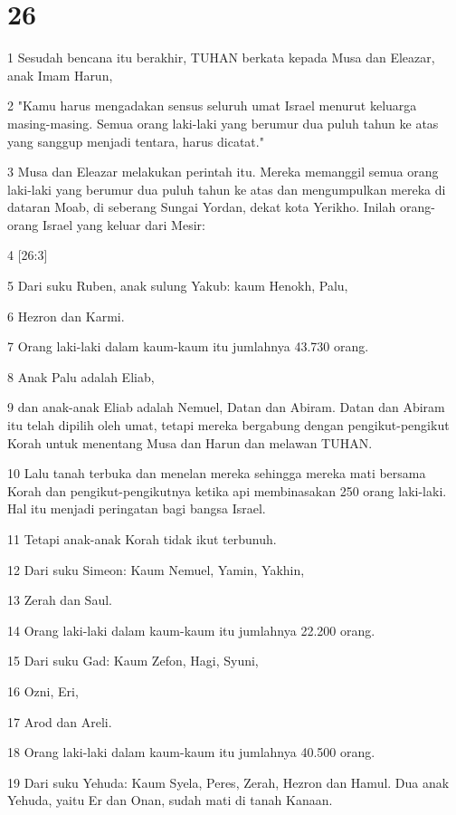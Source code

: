 \chapter{26}

\par 1 Sesudah bencana itu berakhir, TUHAN berkata kepada Musa dan Eleazar, anak Imam Harun,
\par 2 "Kamu harus mengadakan sensus seluruh umat Israel menurut keluarga masing-masing. Semua orang laki-laki yang berumur dua puluh tahun ke atas yang sanggup menjadi tentara, harus dicatat."
\par 3 Musa dan Eleazar melakukan perintah itu. Mereka memanggil semua orang laki-laki yang berumur dua puluh tahun ke atas dan mengumpulkan mereka di dataran Moab, di seberang Sungai Yordan, dekat kota Yerikho. Inilah orang-orang Israel yang keluar dari Mesir:
\par 4 [26:3]
\par 5 Dari suku Ruben, anak sulung Yakub: kaum Henokh, Palu,
\par 6 Hezron dan Karmi.
\par 7 Orang laki-laki dalam kaum-kaum itu jumlahnya 43.730 orang.
\par 8 Anak Palu adalah Eliab,
\par 9 dan anak-anak Eliab adalah Nemuel, Datan dan Abiram. Datan dan Abiram itu telah dipilih oleh umat, tetapi mereka bergabung dengan pengikut-pengikut Korah untuk menentang Musa dan Harun dan melawan TUHAN.
\par 10 Lalu tanah terbuka dan menelan mereka sehingga mereka mati bersama Korah dan pengikut-pengikutnya ketika api membinasakan 250 orang laki-laki. Hal itu menjadi peringatan bagi bangsa Israel.
\par 11 Tetapi anak-anak Korah tidak ikut terbunuh.
\par 12 Dari suku Simeon: Kaum Nemuel, Yamin, Yakhin,
\par 13 Zerah dan Saul.
\par 14 Orang laki-laki dalam kaum-kaum itu jumlahnya 22.200 orang.
\par 15 Dari suku Gad: Kaum Zefon, Hagi, Syuni,
\par 16 Ozni, Eri,
\par 17 Arod dan Areli.
\par 18 Orang laki-laki dalam kaum-kaum itu jumlahnya 40.500 orang.
\par 19 Dari suku Yehuda: Kaum Syela, Peres, Zerah, Hezron dan Hamul. Dua anak Yehuda, yaitu Er dan Onan, sudah mati di tanah Kanaan.
